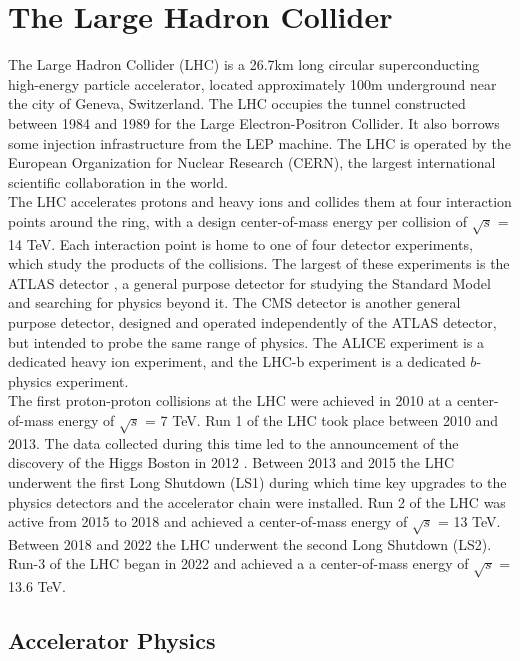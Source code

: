 \chapter{The Large Hadron Collider}
The Large Hadron Collider (LHC) \cite{LHC_machine} is a 26.7km long circular superconducting high-energy particle accelerator, located approximately 100m underground near the city of Geneva, Switzerland. The LHC occupies the tunnel constructed between 1984 and 1989 for the Large Electron-Positron Collider. It also borrows some injection infrastructure from the LEP machine. The LHC is operated by the European Organization for Nuclear Research (CERN), the largest international scientific collaboration in the world.\\

The LHC accelerates protons and heavy ions and collides them at four interaction points around the ring, with a design center-of-mass energy per collision of $\sqrt{s}$ = 14 TeV. Each interaction point is home to one of four detector experiments, which study the products of the collisions. The largest of these experiments is the ATLAS detector \cite{ATLAS_at_LHC}, a general purpose detector for studying the Standard Model and searching for physics beyond it. The CMS detector \cite{CMS_at_LHC}is another general purpose detector, designed and operated independently of the ATLAS detector, but intended to probe the same range of physics. The ALICE \cite{ALICE_at_LHC} experiment is a dedicated heavy ion experiment, and the LHC-b \cite{LHCb_at_LHC} experiment is a dedicated $b$-physics experiment.\\

The first proton-proton collisions at the LHC were achieved in 2010 at a center-of-mass energy of $\sqrt{s}$ = 7 TeV. Run 1 of the LHC took place between 2010 and 2013. The data collected during this time led to the announcement of the discovery of the Higgs Boston in 2012 \cite{higgs_paper}. Between 2013 and 2015 the LHC underwent the first Long Shutdown (LS1) during which time key upgrades to the physics detectors and the accelerator chain were installed. Run 2 of the LHC was active from 2015 to 2018 and achieved a center-of-mass energy of $\sqrt{s}$ = 13 TeV. Between 2018 and 2022 the LHC underwent the second Long Shutdown (LS2). Run-3 of the LHC began in 2022 and achieved a a center-of-mass energy of $\sqrt{s}$ = 13.6 TeV.

 \section{Accelerator Physics}
